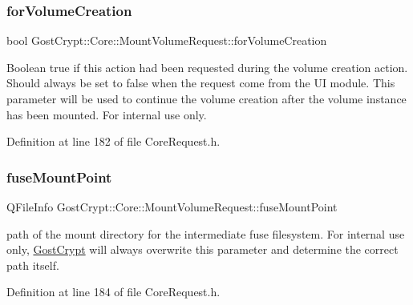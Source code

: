 \mbox{\label{struct_gost_crypt_1_1_core_1_1_mount_volume_request_ace199165f29bbb7c9eca0abd5ce4e183}} 
\subsubsection{\texorpdfstring{for\+Volume\+Creation}{forVolumeCreation}}
{\footnotesize\ttfamily bool Gost\+Crypt\+::\+Core\+::\+Mount\+Volume\+Request\+::for\+Volume\+Creation}

Boolean true if this action had been requested during the volume creation action. Should always be set to false when the request come from the UI module. This parameter will be used to continue the volume creation after the volume instance has been mounted. For internal use only. 

Definition at line 182 of file Core\+Request.\+h.

\mbox{\label{struct_gost_crypt_1_1_core_1_1_mount_volume_request_a592dd05d50e4815aa3556ad9f61197c3}} 
\subsubsection{\texorpdfstring{fuse\+Mount\+Point}{fuseMountPoint}}
{\footnotesize\ttfamily Q\+File\+Info Gost\+Crypt\+::\+Core\+::\+Mount\+Volume\+Request\+::fuse\+Mount\+Point}

path of the mount directory for the intermediate fuse filesystem. For internal use only, \hyperlink{namespace_gost_crypt}{Gost\+Crypt} will always overwrite this parameter and determine the correct path itself. 

Definition at line 184 of file Core\+Request.\+h.

\mbox{\label{struct_gost_crypt_1_1_core_1_1_mount_volume_request_ad56e4661f589cbe8e9e861fc139787da}} 
